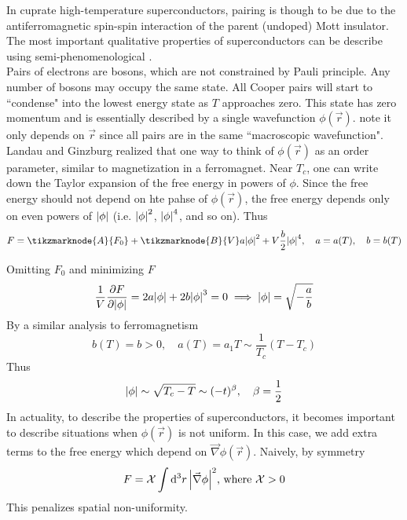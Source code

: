 \documentclass[12pt,a4paper,titlepage]{article}
\newcommand{\trm}[1]{\textrm{#1}} %
\newcommand{\ul}[1]{\underline{\smash{#1}}} %
\newcommand{\Chi}{\mathcal{X}} %
\begin{document}
In cuprate high-temperature superconductors, pairing is though to be due to the antiferromagnetic spin-spin interaction of the parent (undoped) Mott insulator.\\

The most important qualitative properties of superconductors can be describe using semi-phenomenological \ul{Landau Ginzburg theory}.\\

Pairs of electrons are bosons, which are not constrained by Pauli principle. Any number of bosons may occupy the same state. All Cooper pairs will start to ``condense" into the lowest energy state as $T$ approaches zero. This state has zero momentum and is essentially described by a single wavefunction $\phi(\vec{r})$. note it only depends on $\vec{r}$ since all pairs are in the same ``macroscopic wavefunction". Landau and Ginzburg realized that one way to think of $\phi(\vec{r})$ as an order parameter, similar to magnetization in a ferromagnet. Near $T_{c}$, one can write down the Taylor expansion of the free energy in powers of $\phi$. Since the free energy should not depend on hte pahse of $\phi(\vec{r})$, the free energy depends only on even powers of $\abs{\phi}$ (i.e. $\abs{\phi}^{2}$, $\abs{\phi}^{4}$, and so on). Thus
\begin{equation}
F=\tikzmarknode{A}{F_{0}}+\tikzmarknode{B}{V}a\abs{\phi}^{2}+V\frac{b}{2}\abs{\phi}^{4},\quad a=a(T),\quad b=b(T)
\end{equation}
\vspace{1cm}

Omitting $F_{0}$ and minimizing $F$
\begin{equation}
\frac{1}{V}\pdv{F}{\abs{\phi}}=2a\abs{\phi}+2b\abs{\phi}^{3}=0\implies\abs{\phi}=\sqrt{-\frac{a}{b}}
\end{equation}
By a similar analysis to ferromagnetism
\begin{equation}
b(T)=b>0,\quad a(T)=a_{1}T\sim\frac{1}{T_{c}}(T-T_{c})
\end{equation}
Thus
\begin{equation}
\abs{\phi}\sim\sqrt{T_{c}-T}\sim(-t)^{\beta},\quad\beta=\frac{1}{2}
\end{equation}
In actuality, to describe the properties of superconductors, it becomes important to describe situations when $\phi(\vec{r})$ is not uniform. In this case, we add extra terms to the free energy which depend on $\vec{\nabla}\phi(\vec{r})$. Naively, by symmetry
\begin{equation}
F=\Chi\int\dd[3]{r}\abs{\vec{\nabla}\phi}^{2}\trm{, where $\Chi>0$}
\end{equation}
This penalizes spatial non-uniformity.\\
\end{document}
